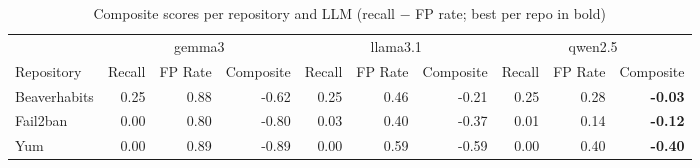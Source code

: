 \begin{table}[htbp]
\centering
\begin{tabular}{l rrr rrr rrr}
\toprule
 & \multicolumn{3}{c}{gemma3} & \multicolumn{3}{c}{llama3.1} & \multicolumn{3}{c}{qwen2.5} \\
\cmidrule(lr){2-4}\cmidrule(lr){5-7}\cmidrule(lr){8-10}
Repository & Recall & FP Rate & Composite & Recall & FP Rate & Composite & Recall & FP Rate & Composite \\
\midrule
Beaverhabits & 0.25 & 0.88 & -0.62 & 0.25 & 0.46 & -0.21 & 0.25 & 0.28 & \textbf{-0.03} \\
Fail2ban & 0.00 & 0.80 & -0.80 & 0.03 & 0.40 & -0.37 & 0.01 & 0.14 & \textbf{-0.12} \\
Yum & 0.00 & 0.89 & -0.89 & 0.00 & 0.59 & -0.59 & 0.00 & 0.40 & \textbf{-0.40} \\
\bottomrule
\end{tabular}
\caption{Composite scores per repository and LLM (recall $-$ FP rate; best per repo in bold)}
\label{tab:composite_scores}
\end{table}
